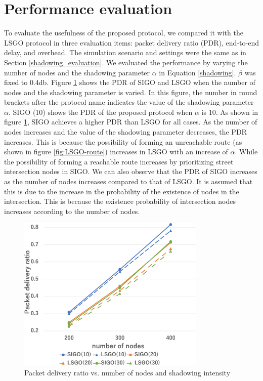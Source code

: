 \documentclass[conference]{IEEEtran}
\begin{document}
\section{Performance evaluation}
\label{evaluation}
To evaluate the usefulness of the proposed protocol, we compared it with the LSGO protocol in three evaluation items: packet delivery ratio (PDR), end-to-end delay, and overhead.
The simulation scenario and settings were the same as in Section \ref{shadowing_evaluation}. 
We evaluated the performance by varying the number of nodes and the shadowing parameter $\alpha$ in Equation \ref{shadowing}. 
$\beta$ was fixed to 0.4db.
Figure \ref{fig:PDR} shows the PDR of SIGO and LSGO when the number of nodes and the shadowing parameter is varied. 
In this figure, the number in round brackets after the protocol name indicates the value of the shadowing parameter $\alpha$. SIGO (10) shows the PDR of the proposed protocol when $\alpha$ is 10.
As shown in figure \ref{fig:PDR}, SIGO achieves a higher PDR than LSGO for all cases. 
As the number of nodes increases and the value of the shadowing parameter decreases, the PDR increases. This is because the possibility of forming an unreachable route (as shown in figure \ref{fig:LSGO-route}) increases in LSGO with an increase of $\alpha$. While the possibility of forming a reachable route increases by prioritizing street intersection nodes in SIGO.
We can also observe that the PDR of SIGO increases as the number of nodes increases compared to that of LSGO. It is assumed that this is due to the increase in the probability of the existence of nodes in the intersection. 
This  is because the existence probability of intersection nodes increases according to the number of nodes.

\begin{figure}[!ht]
\centering
\includegraphics[width=90mm]{figures/PDR.eps}
\caption{Packet delivery ratio vs. number of nodes and shadowing intensity}
\label{fig:PDR}
\end{figure}
\end{document}
